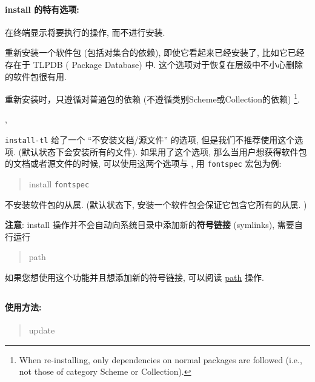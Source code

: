 \paragraph{{\mdseries\ac{install}} 的特有选项:}
\begin{description}
    \item {}\par
    在终端显示将要执行的操作, 而不进行安装. 
    \item {}\par
    重新安装一个软件包 (包括对集合的依赖), 即使它看起来已经安装了, 比如它已经存在于 TLPDB (\tl{} Package Database) 中. 这个选项对于恢复在层级中不小心删除的软件包很有用. 

    重新安装时，只遵循对普通包的依赖 (不遵循类别Scheme或Collection的依赖)%
    \footnote{When re-installing, only dependencies on normal packages are followed (i.e., not those of category Scheme or Collection).}. 
    \item {}, \par
    \texttt{install-tl} 给了一个 ``不安装文档/源文件'' 的选项, 但是我们不推荐使用这个选项. (默认状态下会安装所有的文件). 如果用了这个选项, 那么当用户想获得软件包的文档或者源文件的时候, 可以使用这两个选项与 , 用 \texttt{fontspec} 宏包为例: 
    \begin{quote}
        \tlmgr{} \ac{install}    \texttt{fontspec}
    \end{quote}
    \item {}\par
    不安装软件包的从属. (默认状态下, 安装一个软件包会保证它包含它所有的从属. )
\end{description}

    \textbf{注意}: \ac{install} 操作并不会自动向系统目录中添加新的\textbf{符号链接} (symlinks), 需要自行运行
    \begin{quote}
        \tlmgr{} \ac{path} 
    \end{quote}
    如果您想使用这个功能并且想添加新的符号链接, 可以阅读 \href{https://www.tug.org/texlive/doc/tlmgr.html#path}{path} 操作. 

\subsection{}\label{subsec:update}

\paragraph{使用方法:}
\begin{quote}
    \tlmgr{} \ac{update} 
\end{quote}

